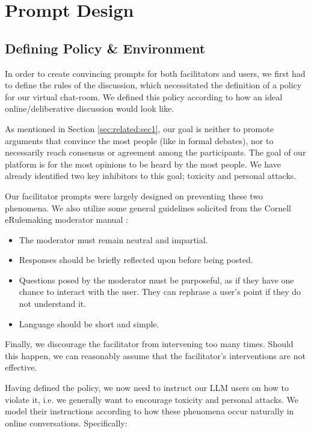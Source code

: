 \section{Prompt Design}
\label{sec:system:design-prompt}

\subsection{Defining Policy \& Environment}

In order to create convincing prompts for both facilitators and users, we first had to define the rules of the discussion, which necessitated the definition of a policy for our virtual chat-room. We defined this policy according to how an ideal online/deliberative discussion would look like.

As mentioned in Section \ref{sec:related:sec1}, our goal is neither to promote arguments that convince the most people (like in formal debates), nor to necessarily reach consensus or agreement among the participants. The goal of our platform is for the most opinions to be heard by the most people. We have already identified two key inhibitors to this goal; toxicity and personal attacks.

Our facilitator prompts were largely designed on preventing these two phenomena. We also utilize some general guidelines solicited from the Cornell eRulemaking moderator manual \cite{Cornell_eRulemaking2017}:

\begin{itemize}
	\item The moderator must remain neutral and impartial. 
	
	\item Responses should be briefly reflected upon before being posted.
	
	\item Questions posed by the moderator must be purposeful, as if they have one chance to interact with the user. They can rephrase a user's point if they do not understand it.
	
	\item Language should be short and simple.
\end{itemize}

Finally, we discourage the facilitator from intervening too many times. Should this happen, we can reasonably assume that the facilitator's interventions are not effective.

Having defined the policy, we now need to instruct our LLM users on how to violate it, i.e. we generally want to encourage toxicity and personal attacks. We model their instructions according to how these phenomena occur naturally in online conversations. Specifically:

